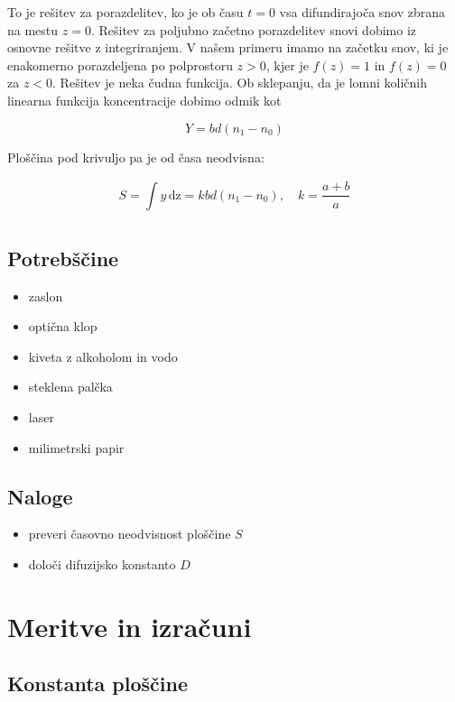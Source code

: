 \documentclass[11pt]{article}
\begin{document}
To je rešitev za porazdelitev, ko je ob času \(t = 0\) vsa difundirajoča snov zbrana na mestu \(z=0\). Rešitev za poljubno začetno porazdelitev snovi dobimo iz osnovne rešitve z integriranjem. V našem primeru imamo na začetku snov, ki je enakomerno porazdeljena po polprostoru \(z > 0\), kjer je \(f(z) = 1\) in \(f(z) = 0\) za \(z< 0\). Rešitev je neka čudna funkcija. Ob sklepanju, da je lomni količnih linearna funkcija koncentracije dobimo odmik kot

\begin{equation}
\label{eq:5}
Y = bd (n_1 - n_0)
\end{equation}

Ploščina pod krivuljo pa je od časa neodvisna:

\begin{equation}
\label{eq:6}
S = \int\limits_{}^{} y \,\mathrm{d z} = kbd(n_1 - n_0), \quad k = \frac{a + b}{a}
\end{equation}

\subsection{Potrebščine}\label{sec:orgbc5db6b}
\begin{itemize}
\item zaslon
\item optična klop
\item kiveta z alkoholom in vodo
\item steklena palčka
\item laser
\item milimetrski papir
\end{itemize}

\subsection{Naloge}\label{sec:orga510493}
\begin{itemize}
\item preveri časovno neodvisnost ploščine \(S\)
\item določi difuzijsko konstanto \(D\)
\end{itemize}
\section{Meritve in izračuni}\label{sec:org161f0a0}

\subsection{Konstanta ploščine}\label{sec:org31b401e}
\end{document}
